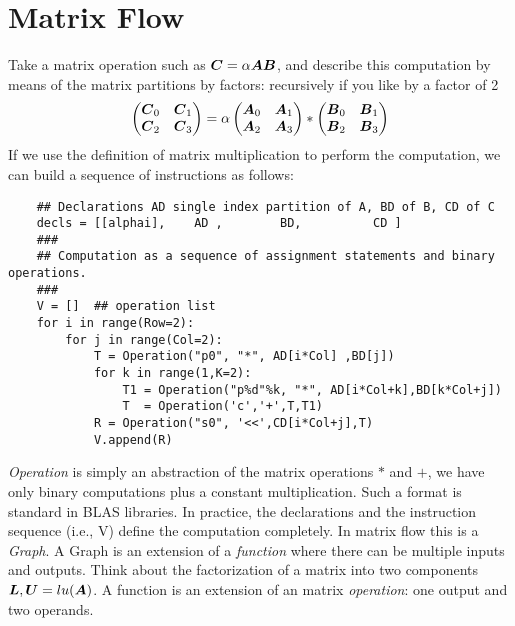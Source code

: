 \documentclass[acmsmall]{acmart}
\begin{document}
\section{Matrix Flow}
\label{sec:matrixflow}

Take a matrix operation such as ${\boldsymbol C} = \alpha {\boldsymbol A}{\boldsymbol B}$, and
describe this computation by means of the matrix partitions by
factors: recursively if you like by a factor of 2
\begin{equation}
  \label{basic_2}
  \begin{pmatrix}
    {\boldsymbol C}_0 & {\boldsymbol C}_1 \\
    {\boldsymbol C}_2 & {\boldsymbol C}_3 \\
  \end{pmatrix} = \alpha
  \begin{pmatrix}
    {\boldsymbol A}_0 & {\boldsymbol A}_1 \\
    {\boldsymbol A}_2 & {\boldsymbol A}_3 \\
  \end{pmatrix} *
  \begin{pmatrix}
    {\boldsymbol B}_0 & {\boldsymbol B}_1 \\
    {\boldsymbol B}_2 & {\boldsymbol B}_3 \\
  \end{pmatrix} 
\end{equation}
If we use the definition of matrix multiplication to perform the
computation, we can build a sequence of instructions as follows:
{\small \begin{verbatim}
    ## Declarations AD single index partition of A, BD of B, CD of C 
    decls = [[alphai],    AD ,        BD,          CD ]     
    ###
    ## Computation as a sequence of assignment statements and binary operations.  
    ###
    V = []  ## operation list  
    for i in range(Row=2):
        for j in range(Col=2):
            T = Operation("p0", "*", AD[i*Col] ,BD[j])
            for k in range(1,K=2):
                T1 = Operation("p%d"%k, "*", AD[i*Col+k],BD[k*Col+j])
                T  = Operation('c','+',T,T1)
            R = Operation("s0", '<<',CD[i*Col+j],T)
            V.append(R)
\end{verbatim}}
{\em Operation} is simply an abstraction of the matrix operations $*$
and $+$, we have only binary computations plus a constant
multiplication. Such a format is standard in BLAS libraries. In
practice, the declarations and the instruction sequence (i.e., V)
define the computation completely. In matrix flow this is a {\em
  Graph}. A Graph is an extension of a {\em function} where there can
be multiple inputs and outputs.  Think about the factorization of a
matrix into two components ${\boldsymbol L},{\boldsymbol U} = lu({\boldsymbol A})$. A function is
an extension of an matrix {\em operation}: one output and two
operands.
\end{document}
